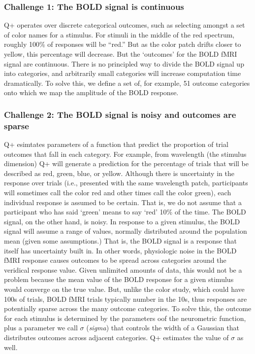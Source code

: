 \documentclass[
  man,floatsintext]{apa6}
\begin{document}
\hypertarget{challenge-1-the-bold-signal-is-continuous}{%
\subsubsection{Challenge 1: The BOLD signal is continuous}\label{challenge-1-the-bold-signal-is-continuous}}

Q+ operates over discrete categorical outcomes, such as selecting amongst a set of color names for a stimulus. For stimuli in the middle of the red spectrum, roughly 100\% of responses will be ``red.'' But as the color patch drifts closer to yellow, this percentage will decrease. But the `outcomes' for the BOLD fMRI signal are continuous. There is no principled way to divide the BOLD signal up into categories, and arbitrarily small categories will increase computation time dramatically. To solve this, we define a set of, for example, 51 outcome categories onto which we map the amplitude of the BOLD response.

\hypertarget{challenge-2-the-bold-signal-is-noisy-and-outcomes-are-sparse}{%
\subsubsection{Challenge 2: The BOLD signal is noisy and outcomes are sparse}\label{challenge-2-the-bold-signal-is-noisy-and-outcomes-are-sparse}}

Q+ esimtates parameters of a function that predict the proportion of trial outcomes that fall in each category. For example, from wavelength (the stimulus dimension) Q+ will generate a prediction for the percentage of trials that will be described as red, green, blue, or yellow. Although there is uncertainty in the response over trials (i.e., presented with the same wavelength patch, participants will sometimes call the color red and other times call the color green), each individual response is assumed to be certain. That is, we do not assume that a participant who has said `green' means to say `red' 10\% of the time. The BOLD signal, on the other hand, is noisy. In response to a given stimulus, the BOLD signal will assume a range of values, normally distributed around the population mean (given some assumptions.) That is, the BOLD signal is a response that itself has uncertainty built in. In other words, physiologic noise in the BOLD fMRI response causes outcomes to be spread across categories around the veridical response value. Given unlimited amounts of data, this would not be a problem because the mean value of the BOLD response for a given stimulus would converge on the true value. But, unlike the color study, which could have 100s of trials, BOLD fMRI trials typically number in the 10s, thus responses are potentially sparse across the many outcome categories. To solve this, the outcome for each stimulus is determined by the parameters oof the neurometric function, plus a parameter we call \(\sigma\) (\emph{sigma}) that controls the width of a Gaussian that distributes outcomes across adjacent categories. Q+ estimates the value of \(\sigma\) as well.
\end{document}
